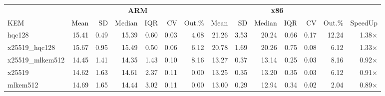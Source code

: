 \begin{table}[!ht]
\centering
\begin{tabular}{l|rrrrrr|rrrrrr|r}
\toprule
& \multicolumn{6}{c}{\bfseries ARM} & \multicolumn{6}{c}{\bfseries x86} & \\
\cmidrule(lr){2-7} \cmidrule(lr){8-13}
KEM & Mean & SD & Median & IQR & CV & Out.\% & Mean & SD & Median & IQR & CV & Out.\% & SpeedUp \\
\midrule
hqc128 & 15.41 & 0.49 & 15.39 & 0.60 & 0.03 & 4.08 & 21.26 & 3.53 & 20.24 & 0.66 & 0.17 & 12.24 & 1.38× \\
x25519_hqc128 & 15.67 & 0.95 & 15.49 & 0.50 & 0.06 & 6.12 & 20.78 & 1.69 & 20.26 & 0.75 & 0.08 & 6.12 & 1.33× \\
x25519_mlkem512 & 14.45 & 1.41 & 14.35 & 1.43 & 0.10 & 8.16 & 13.27 & 0.37 & 13.14 & 0.25 & 0.03 & 8.16 & 0.92× \\
x25519 & 14.62 & 1.63 & 14.61 & 2.37 & 0.11 & 0.00 & 13.25 & 0.35 & 13.20 & 0.35 & 0.03 & 6.12 & 0.91× \\
mlkem512 & 14.69 & 1.65 & 14.44 & 3.02 & 0.11 & 0.00 & 13.00 & 0.29 & 12.94 & 0.34 & 0.02 & 2.04 & 0.89× \\
\bottomrule
\end{tabular}
\end{table}
